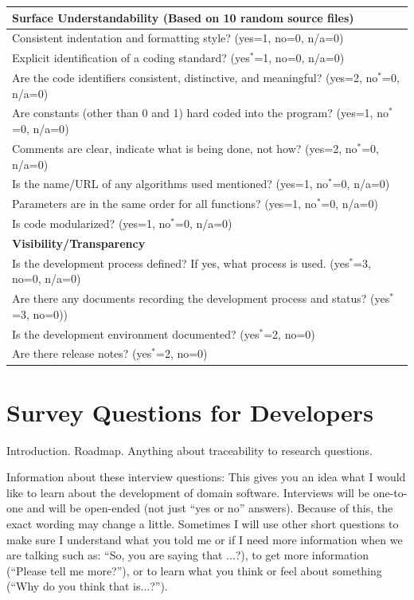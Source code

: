 \documentclass[letterpaper,cleveref]{lipics-v2019}
\begin{document}
\def\arraystretch{1.4}
\begin{tabular}{p{14cm}}
\hline	
\textbf{Surface Understandability (Based on 10 random source files)}\\
\hline
Consistent indentation and formatting style? ({yes=1, no=0, n/a=0})\\
Explicit identification of a coding standard? ({yes$^*$=1, no=0, n/a=0})\\
Are the code identifiers consistent, distinctive, and meaningful? ({yes=2,
no$^*$=0, n/a=0})\\
Are constants (other than 0 and 1) hard coded into the program? ({yes=1, no$^*$=0,
n/a=0})\\
Comments are clear, indicate what is being done, not how? ({yes=2, no$^*$=0,
n/a=0})\\
Is the name/URL of any algorithms used mentioned? ({yes=1, no$^*$=0, n/a=0})\\
Parameters are in the same order for all functions? ({yes=1, no$^*$=0, n/a=0})\\
Is code modularized? ({yes=1, no$^*$=0, n/a=0})\\
\hline		
\textbf{Visibility/Transparency}\\
\hline
Is the development process defined? If yes, what process is used. ({yes$^*$=3,
no=0, n/a=0})\\
Are there any documents recording the development process and status?  ({yes$^*$=3,
no=0}))\\
Is the development environment documented? ({yes$^*$=2, no=0})\\
Are there release notes? ({yes$^*$=2, no=0})\\
\hline
\end{tabular}

\newpage

\section{Survey Questions for Developers} \label{SecSurveyQuestions}

Introduction.  Roadmap.  Anything about traceability to research questions.

Information about these interview questions:  This gives you an idea what I
would like to learn about the development of {domain} software. Interviews will
be one-to-one and will be open-ended (not just “yes or no” answers). Because of
this, the exact wording may change a little. Sometimes I will use other short
questions to make sure I understand what you told me or if I need more
information when we are talking such as: “So, you are saying that ...?), to get
more information (“Please tell me more?”), or to learn what you think or feel
about something (“Why do you think that is...?”). 
\end{document}
